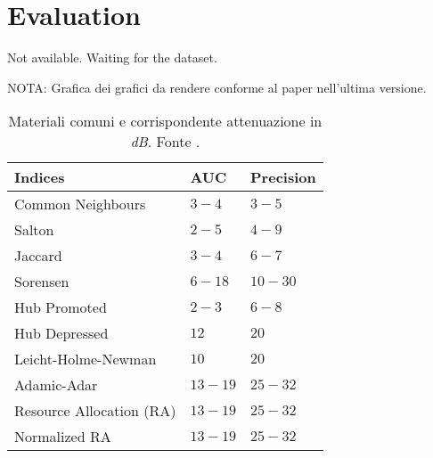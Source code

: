 \section{Evaluation}
\label{sec:evaluation}

Not available. Waiting for the dataset.

NOTA: Grafica dei grafici da rendere conforme al paper nell'ultima versione.




    \begin{table}[h]
		\centering
		\begin{tabular}{l l l}
		\toprule
		\textbf{Indices} & \textbf{AUC} & \textbf{Precision}\\
		\midrule
			Common Neighbours & $3-4$ & $3-5$\\
			Salton  & $2-5$ & $4-9$\\
			Jaccard & $3-4$ & $6-7$\\
			Sorensen  & $6-18$ & $10-30$\\
			Hub Promoted  & $2-3$ & $6-8$\\
			Hub Depressed & $12$ & $20$\\
			Leicht-Holme-Newman & $10$ & $20$\\
			Adamic-Adar & $13-19$ & $25-32$\\
			Resource Allocation (RA) & $13-19$ & $25-32$\\
			Normalized RA & $13-19$ & $25-32$\\
		\bottomrule
		\end{tabular}
		\label{tab:attenuazione}
		\caption{Materiali comuni e corrispondente attenuazione in \textit{dB}. Fonte \cite{Attenuazione}.}
	\end{table}	

